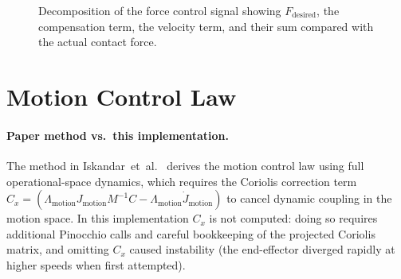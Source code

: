 \documentclass[
	german,%
	accentcolor=9c,%
	ruledheaders=section,%
	class=report,%
	thesis={type=bachelor},%
	fontsize=11pt,%
	parskip=half-,%
	custommargins=true,%
	marginpar=false,%
]{tudapub}
\begin{document}
\begin{figure}[htbp]
    \centering
    \caption{Decomposition of the force control signal showing
             $F_\text{desired}$, the compensation term, the velocity term,
             and their sum compared with the actual contact force.}
    \label{fig:force_decomposition}
\end{figure}


\section{Motion Control Law}
\label{sec:motion_ctrl}

\paragraph{Paper method vs.\ this implementation.}
The method in Iskandar~et~al.~\cite{iskandar2023} derives the motion control
law using full operational-space dynamics, which requires the Coriolis
correction term
\(C_x = (\Lambda_\text{motion} J_\text{motion} M^{-1} C
         - \Lambda_\text{motion} \dot{J}_\text{motion})\)
to cancel dynamic coupling in the motion space.
In this implementation \(C_x\) is not computed: doing so requires additional
Pinocchio calls and careful bookkeeping of the projected Coriolis matrix,
and omitting \(C_x\) caused instability (the end-effector diverged rapidly at
higher speeds when first attempted).
\end{document}

